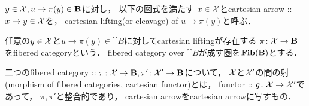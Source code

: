 \begin{Def}
\begin{myenum}
\item
    $y \in \mathcal{X}, u \to \pi(y) \in \mathbf{B}$に対し，
    以下の図式を満たす
    \underline{$x \in \mathcal{X}$とcartesian arrow :: $x \to y \in \mathcal{X}$}を，
    cartesian lifting(or cleavage) of $u \to \pi(y)$と呼ぶ．
    \begin{center}
    \end{center}

\item
    任意の$y \in \mathcal{X}$と$u \to \pi(y) \in \cat{B}$に対してcartesian liftingが存在する
    $\pi \colon \mathcal{X} \to \mathbf{B}$をfibered categoryという．
    fibered category over $\cat{B}$が成す圏を$\mathbf{Fib}(\mathbf{B})$とする．

\item
    二つのfibered category :: 
    $\pi \colon \mathcal{X} \to \mathbf{B}, \pi' \colon \mathcal{X}' \to \mathbf{B}$について，
    $\mathcal{X}$と$\mathcal{X}'$の間の射(morphism of fibered categories, cartesian functor)とは，
    functor :: $g \colon \mathcal{X} \to \mathcal{X}'$であって，
    $\pi, \pi'$と整合的であり，
    cartesian arrowをcartesian arrowに写すもの．

\item
\end{myenum}
\end{Def}

